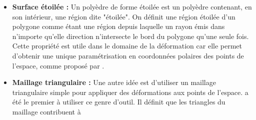 \begin{itemize}
\item{\textbf{Surface étoilée :}} Un polyèdre de forme étoilée est un
  polyèdre contenant, en son intérieur, une région dite "étoilée". On
  définit une région étoilée d'un polygone comme étant une région
  depuis laquelle un rayon émis dans n'importe qu'elle direction
  n'intersecte le bord du polygone qu'une seule fois. Cette propriété
  est utile dans le domaine de la déformation car elle permet
  d'obtenir une unique paramétrisation en coordonnées polaires des
  points de l'espace, comme proposé par \cite{JL00}.
\item{\textbf{Maillage triangulaire :}} Une autre idée est d'utiliser
  un maillage triangulaire simple pour appliquer des déformations aux
  points de l'espace. \cite{KO03} a été le premier à utiliser ce genre
  d'outil. Il définit que les triangles du maillage contribuent à

\end{itemize}
